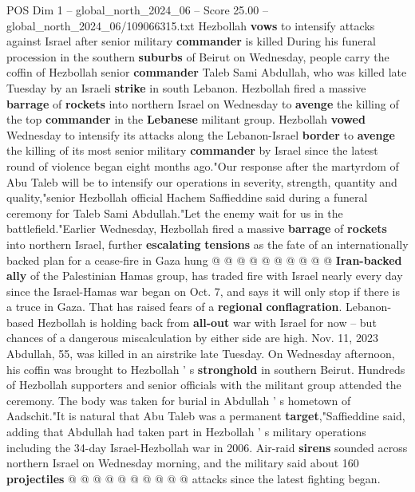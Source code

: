 \begin{textsample}{POS Dim 1 – global\_north\_2024\_06 – Score 25.00 – global\_north\_2024\_06/109066315.txt}  \label{ex:f1_pos_312}
Hezbollah \textbf{vows} to intensify attacks against Israel after senior military \textbf{commander} is killed During his funeral procession in the southern \textbf{suburbs} of Beirut on Wednesday, people carry the coffin of Hezbollah senior \textbf{commander} Taleb Sami Abdullah, who was killed late Tuesday by an Israeli \textbf{strike} in south Lebanon.
Hezbollah fired a massive \textbf{barrage} of \textbf{rockets} into northern Israel on Wednesday to \textbf{avenge} the killing of the top \textbf{commander} in the \textbf{Lebanese} militant group.
Hezbollah \textbf{vowed} Wednesday to intensify its attacks along the Lebanon-Israel \textbf{border} to \textbf{avenge} the killing of its most senior military \textbf{commander} by Israel since the latest round of violence began eight months ago."Our response after the martyrdom of Abu Taleb will be to intensify our operations in severity, strength, quantity and quality,"senior Hezbollah official Hachem Saffieddine said during a funeral ceremony for Taleb Sami Abdullah."Let the enemy wait for us in the battlefield."Earlier Wednesday, Hezbollah fired a massive \textbf{barrage} of \textbf{rockets} into northern Israel, further \textbf{escalating} \textbf{tensions} as the fate of an internationally backed plan for a cease-fire in Gaza hung @ @ @ @ @ @ @ @ @ @ \textbf{Iran-backed} \textbf{ally} of the Palestinian Hamas group, has traded fire with Israel nearly every day since the Israel-Hamas war began on Oct. 7, and says it will only stop if there is a truce in Gaza.
That has raised fears of a \textbf{regional} \textbf{conflagration}.
Lebanon-based Hezbollah is holding back from \textbf{all-out} war with Israel for now -- but chances of a dangerous miscalculation by either side are high.
Nov. 11, 2023 Abdullah, 55, was killed in an airstrike late Tuesday.
On Wednesday afternoon, his coffin was brought to Hezbollah ' s \textbf{stronghold} in southern Beirut.
Hundreds of Hezbollah supporters and senior officials with the militant group attended the ceremony.
The body was taken for burial in Abdullah ' s hometown of Aadschit."It is natural that Abu Taleb was a permanent \textbf{target},"Saffieddine said, adding that Abdullah had taken part in Hezbollah ' s military operations including the 34-day Israel-Hezbollah war in 2006.
Air-raid \textbf{sirens} sounded across northern Israel on Wednesday morning, and the military said about 160 \textbf{projectiles} @ @ @ @ @ @ @ @ @ @ attacks since the latest fighting began.

\end{textsample}
